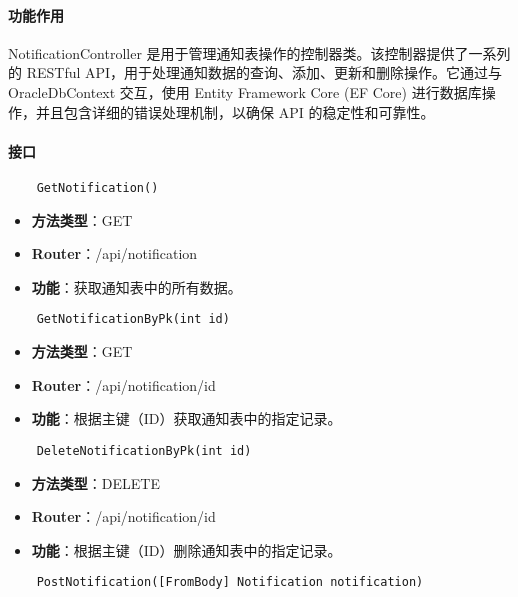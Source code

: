 \paragraph{功能作用}

NotificationController 是用于管理通知表操作的控制器类。该控制器提供了一系列的 RESTful API，用于处理通知数据的查询、添加、更新和删除操作。它通过与 OracleDbContext 交互，使用 Entity Framework Core (EF Core) 进行数据库操作，并且包含详细的错误处理机制，以确保 API 的稳定性和可靠性。

\paragraph{接口}

\begin{verbatim}
	GetNotification()
\end{verbatim}

\begin{itemize}
	\item \textbf{方法类型}：GET
	\item \textbf{Router}：/api/notification
	\item \textbf{功能}：获取通知表中的所有数据。
\end{itemize}

\begin{verbatim}
	GetNotificationByPk(int id)
\end{verbatim}

\begin{itemize}
	\item \textbf{方法类型}：GET
	\item \textbf{Router}：/api/notification/{id}
	\item \textbf{功能}：根据主键（ID）获取通知表中的指定记录。
\end{itemize}

\begin{verbatim}
	DeleteNotificationByPk(int id)
\end{verbatim}

\begin{itemize}
	\item \textbf{方法类型}：DELETE
	\item \textbf{Router}：/api/notification/{id}
	\item \textbf{功能}：根据主键（ID）删除通知表中的指定记录。
\end{itemize}

\begin{verbatim}
	PostNotification([FromBody] Notification notification)
\end{verbatim}

